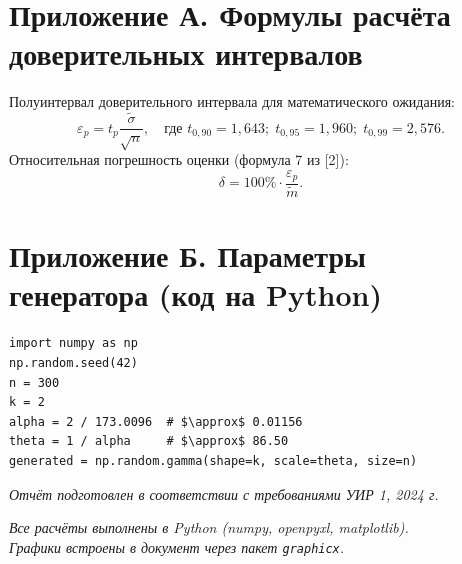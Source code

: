 \documentclass[a4paper,12pt]{article}
\begin{document}
\appendix
\section*{Приложение А. Формулы расчёта доверительных интервалов}

Полуинтервал доверительного интервала для математического ожидания:
\begin{equation}
\varepsilon_p = t_p \frac{\tilde{\sigma}}{\sqrt{n}}, \quad \text{где } t_{0,90}=1{,}643;\; t_{0,95}=1{,}960;\; t_{0,99}=2{,}576.
\end{equation}
Относительная погрешность оценки (формула 7 из [2]):
\begin{equation}
\delta = 100\% \cdot \frac{\varepsilon_p}{\tilde{m}}.
\end{equation}

\section*{Приложение Б. Параметры генератора (код на Python)}

\begin{verbatim}
import numpy as np
np.random.seed(42)
n = 300
k = 2
alpha = 2 / 173.0096  # $\approx$ 0.01156
theta = 1 / alpha     # $\approx$ 86.50
generated = np.random.gamma(shape=k, scale=theta, size=n)
\end{verbatim}

\vfill
\begin{center}
\textit{Отчёт подготовлен в соответствии с требованиями УИР 1, 2024 г.}\par
\textit{Все расчёты выполнены в Python (numpy, openpyxl, matplotlib).}\\
\textit{Графики встроены в документ через пакет \texttt{graphicx}.}
\end{center}
\end{document}
